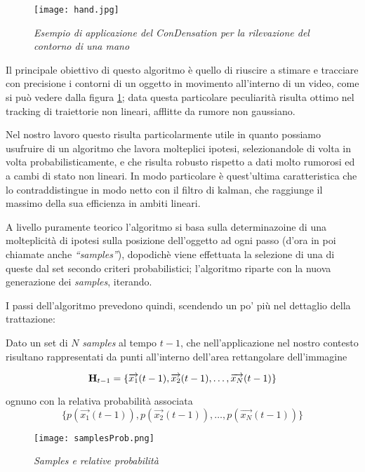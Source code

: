 \begin{figure}[hb]
\centering
	\texttt{[image: hand.jpg]}
\caption{\textit{Esempio di applicazione del ConDensation per la rilevazione del contorno di una mano}\label{fig:hand}}
\end{figure}

Il principale obiettivo di questo algoritmo è quello di riuscire a stimare e tracciare con precisione i contorni di un oggetto in movimento all'interno di un video, come si può vedere dalla figura \ref{fig:hand}; data questa particolare peculiarità risulta ottimo nel tracking di traiettorie non lineari, afflitte da rumore non gaussiano.

Nel nostro lavoro questo risulta particolarmente utile in quanto possiamo usufruire di un algoritmo che lavora molteplici ipotesi, selezionandole di volta in volta probabilisticamente, e che risulta robusto rispetto a dati molto rumorosi ed a cambi di stato non lineari. In modo particolare è quest'ultima caratteristica che lo contraddistingue in modo netto con il filtro di kalman, che raggiunge il massimo della sua efficienza in ambiti lineari.

A livello puramente teorico l'algoritmo si basa sulla determinazoine di una molteplicità di ipotesi sulla posizione dell'oggetto ad ogni passo (d'ora in poi chiamate anche \textit{``samples''}), dopodichè viene effettuata la selezione di una di queste dal set secondo criteri probabilistici; l'algoritmo riparte con la nuova generazione dei \textit{samples}, iterando. 

I passi dell'algoritmo prevedono quindi, scendendo un po' più nel dettaglio della trattazione: 

Dato un set di $N$ \textit{samples} al tempo $t-1$, che nell'applicazione nel nostro contesto risultano rappresentati da punti all'interno dell'area rettangolare dell'immagine

\begin{equation}\label{eq:H}
\mbox{{\bfseries H}}_{t-1}= \lbrace \overrightarrow{x_1}(t-1),\overrightarrow{x_2}(t-1), \ldots,  \overrightarrow{x_N}(t-1) \rbrace
\end{equation} 

ognuno con la relativa probabilità associata
\begin{equation}\label{eq:pH}
\lbrace p(\overrightarrow{x_1}(t-1)),p(\overrightarrow{x_2}(t-1)), \ldots, p( \overrightarrow{x_N}(t-1)) \rbrace
\end{equation} 

\begin{figure}[hb]
\centering
	\texttt{[image: samplesProb.png]}
\caption{\textit{Samples e relative probabilità}\label{fig:samplesProb}}
\end{figure}

